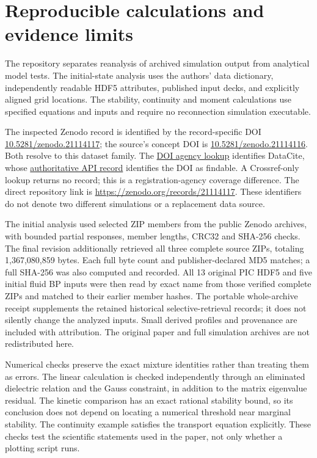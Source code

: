 \section{Reproducible calculations and evidence limits}
\label{sec:reproducibility}
The repository separates reanalysis of archived simulation output from
analytical model tests. The initial-state analysis uses the authors' data
dictionary, independently readable HDF5 attributes, published input decks,
and explicitly aligned grid locations. The stability, continuity and moment
calculations use specified equations and inputs and require no reconnection
simulation executable.

The inspected Zenodo record is identified by the record-specific DOI
\href{https://doi.org/10.5281/zenodo.21114117}{10.5281/zenodo.21114117};
the source's concept DOI is
\href{https://doi.org/10.5281/zenodo.21114116}{10.5281/zenodo.21114116}.
Both resolve to this dataset family.
The \href{https://doi.org/ra/10.5281/zenodo.21114117}{DOI agency lookup}
identifies DataCite, whose
\href{https://api.datacite.org/dois/10.5281/zenodo.21114117}{authoritative API record}
identifies the DOI as findable. A Crossref-only lookup returns no record;
this is a registration-agency coverage difference. The direct repository
link is \url{https://zenodo.org/records/21114117}. These identifiers do not
denote two different simulations or a replacement data source.



The initial analysis used selected ZIP members from the public Zenodo
archives, with bounded partial responses, member lengths, CRC32 and SHA-256
checks. The final revision additionally retrieved all three complete source
ZIPs, totaling 1,367,080,859 bytes. Each full byte count and publisher-declared
MD5 matches; a full SHA-256 was also computed and recorded. All 13 original
PIC HDF5 and five initial fluid BP inputs were then read by exact name from
those verified complete ZIPs and matched to their earlier member hashes.
The portable whole-archive receipt supplements the retained historical
selective-retrieval records; it does not silently change the analyzed inputs.
Small derived profiles and provenance are included with attribution.
The original paper and full simulation archives are not redistributed here.

Numerical checks preserve the exact mixture identities rather than treating
them as errors. The linear calculation is checked independently through an
eliminated dielectric relation and the Gauss constraint, in addition to the
matrix eigenvalue residual. The kinetic comparison has an exact rational
stability bound, so its conclusion does not depend on locating a numerical
threshold near marginal stability. The continuity example satisfies the
transport equation explicitly. These checks test the scientific statements
used in the paper, not only whether a plotting script runs.

